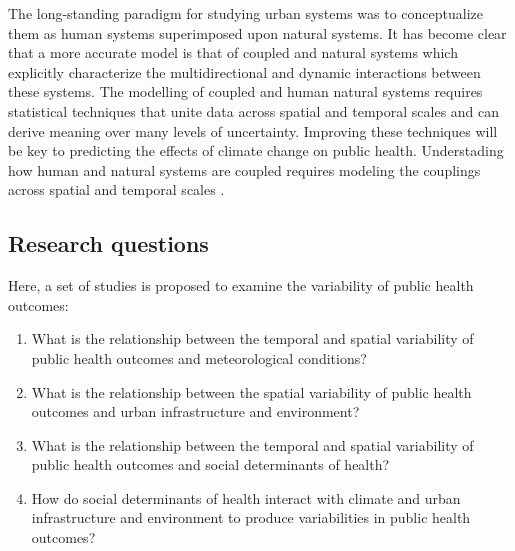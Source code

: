 The long-standing paradigm for studying urban systems was to conceptualize them as human systems superimposed upon natural systems.
It has become clear that a more accurate model is that of coupled and natural systems which explicitly characterize the multidirectional and dynamic interactions between these systems.
The modelling of coupled and human natural systems requires statistical techniques that unite data across spatial and temporal scales and can derive meaning over many levels of uncertainty.
Improving these techniques will be key to predicting the effects of climate change on public health.
Understading how human and natural systems are coupled requires modeling the couplings across spatial and temporal scales \cite{Liu2007a}.

\subsection{Research questions}

Here, a set of studies is proposed to examine the variability of public health outcomes:

\begin{enumerate}
	\item What is the relationship between the temporal and spatial variability of public health outcomes and meteorological conditions?
	\item What is the relationship between the spatial variability of public health outcomes and urban infrastructure and environment?
	\item What is the relationship between the temporal and spatial variability of public health outcomes and social determinants of health?
	\item How do social determinants of health interact with climate and urban infrastructure and environment to produce variabilities in public health outcomes?
\end{enumerate}
